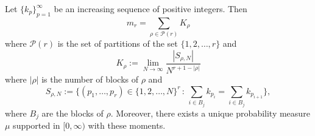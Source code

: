 \documentclass[smallextended]{svjour3}
\begin{document}
\begin{theorem}
Let $\{k_{p}\}_{p=1}^{\infty}$ be an increasing sequence of positive integers. Then
\begin{equation}
m_r = \sum_{\rho\in \mathcal{P}(r)}{K_{\rho}}
\end{equation}
where $\mathcal{P}(r)$ is the set of partitions of the set $\{1,2,\ldots,r\}$ and 
\begin{equation}
K_{\rho}:=\lim_{N\to\infty}\frac{|S_{\rho,N}|}{N^{r+1-|\rho|}}
\end{equation}
where $|\rho|$ is the number of blocks of $\rho$ and 
\begin{equation}
S_{\rho,N}:=\Big\{(p_1,\ldots,p_r)\in\{1,2,\ldots,N\}^{r}\,:\,\sum_{i\in B_{j}}{k_{p_i}}=\sum_{i\in B_{j}}{k_{p_{i+1}}}  \Big\},
\end{equation}
where $B_{j}$ are the blocks of $\rho$. Moreover, there exists a unique probability measure $\mu$ supported in $[0,\infty)$ with these moments.
\end{theorem}
\end{document}
